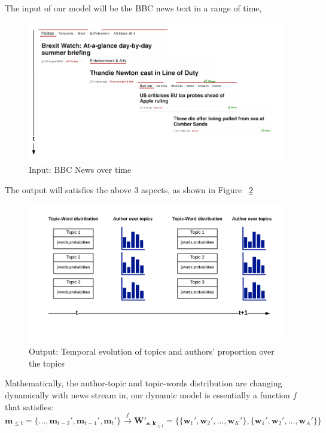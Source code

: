 The input of our model will be the BBC news text in a range of time,

\begin{figure}[h]
\centering
\includegraphics[width=\textwidth]{figures/input.png}
\caption{Input: BBC News over time}
\label{fig:input}
\end{figure}

The output will satisfies the above 3 aspects, as shown in Figure ~\ref{fig:output}
\begin{figure}[h]
\centering
\includegraphics[width=\textwidth]{figures/output.png}
\caption{Output: Temporal evolution of topics and authors’ proportion over the topics }
\label{fig:output}
\end{figure}



Mathematically, the author-topic and topic-words distribution are changing dynamically with news stream in, our dynamic model is essentially a function $f$ that satisfies:
\begin{equation}
\label{eq:task}
\mathbf{m}_{\le t}=\{\ldots, \mathbf{m}_{t-2}', \mathbf{m}_{t-1}', \mathbf{m}_t'\}
\stackrel{f}{\longrightarrow} \boldsymbol W'_{\boldsymbol a,\boldsymbol k}_{\le t}=\{\{\mathbf{w}_1', \mathbf{w}_2', \ldots, \mathbf{w}_K'\},\{\mathbf{w}_1', \mathbf{w}_2', \ldots, \mathbf{w}_A'\}\}
\end{equation}

